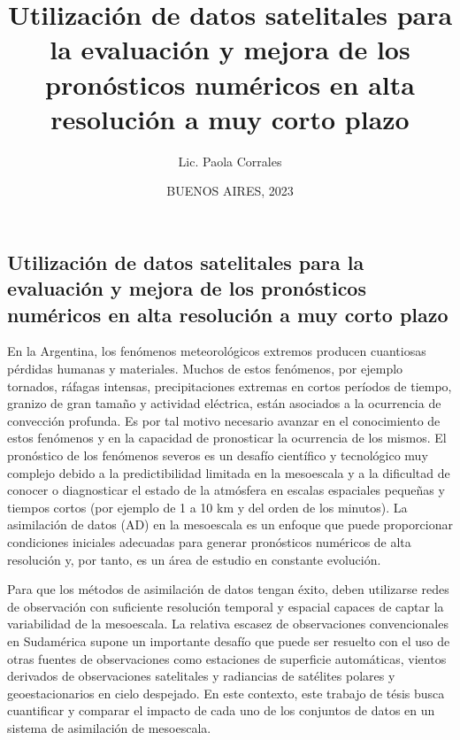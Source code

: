 \documentclass[12pt,oneside,a4paper]{reedthesis}
\title{Utilización de datos satelitales para la evaluación y mejora de los pronósticos numéricos en alta resolución a muy corto plazo}
\author{Lic. Paola Corrales}
\date{BUENOS AIRES, 2023}
\begin{document}
  \maketitle

\frontmatter %
\pagestyle{empty} %
  \begin{resumen}
    \hypertarget{utilizaciuxf3n-de-datos-satelitales-para-la-evaluaciuxf3n-y-mejora-de-los-pronuxf3sticos-numuxe9ricos-en-alta-resoluciuxf3n-a-muy-corto-plazo}{%
    \section*{Utilización de datos satelitales para la evaluación y mejora de los pronósticos numéricos en alta resolución a muy corto plazo}\label{utilizaciuxf3n-de-datos-satelitales-para-la-evaluaciuxf3n-y-mejora-de-los-pronuxf3sticos-numuxe9ricos-en-alta-resoluciuxf3n-a-muy-corto-plazo}}
    
    En la Argentina, los fenómenos meteorológicos extremos producen cuantiosas pérdidas humanas y materiales. Muchos de estos fenómenos, por ejemplo tornados, ráfagas intensas, precipitaciones extremas en cortos períodos de tiempo, granizo de gran tamaño y actividad eléctrica, están asociados a la ocurrencia de convección profunda. Es por tal motivo necesario avanzar en el conocimiento de estos fenómenos y en la capacidad de pronosticar la ocurrencia de los mismos. El pronóstico de los fenómenos severos es un desafío científico y tecnológico muy complejo debido a la predictibilidad limitada en la mesoescala y a la dificultad de conocer o diagnosticar el estado de la atmósfera en escalas espaciales pequeñas y tiempos cortos (por ejemplo de 1 a 10 km y del orden de los minutos). La asimilación de datos (AD) en la mesoescala es un enfoque que puede proporcionar condiciones iniciales adecuadas para generar pronósticos numéricos de alta resolución y, por tanto, es un área de estudio en constante evolución.
    
    Para que los métodos de asimilación de datos tengan éxito, deben utilizarse redes de observación con suficiente resolución temporal y espacial capaces de captar la variabilidad de la mesoescala. La relativa escasez de observaciones convencionales en Sudamérica supone un importante desafío que puede ser resuelto con el uso de otras fuentes de observaciones como estaciones de superficie automáticas, vientos derivados de observaciones satelitales y radiancias de satélites polares y geoestacionarios en cielo despejado. En este contexto, este trabajo de tésis busca cuantificar y comparar el impacto de cada uno de los conjuntos de datos en un sistema de asimilación de mesoescala.
    

\end{resumen}
\end{document}

